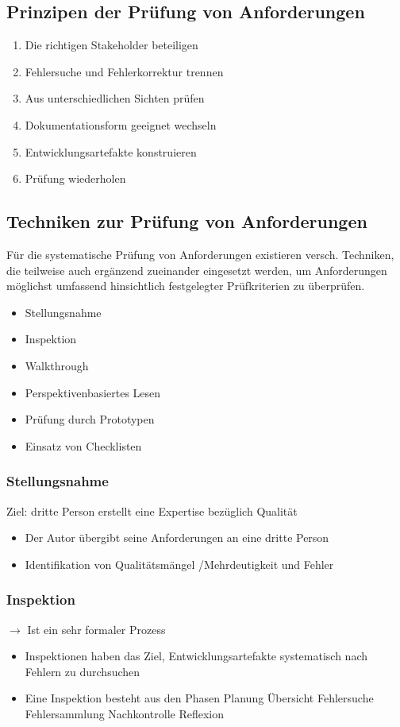 \documentclass{report}
\theoremstyle{definition}
\theoremstyle{example}
\begin{document}
\subsection{Prinzipen der Prüfung von Anforderungen}
\begin{enumerate}
   \item Die richtigen Stakeholder beteiligen
   \item Fehlersuche und Fehlerkorrektur trennen
   \item Aus unterschiedlichen Sichten prüfen
   \item Dokumentationsform geeignet wechseln
   \item Entwicklungsartefakte konstruieren
   \item Prüfung wiederholen
\end{enumerate}

\subsection{Techniken zur Prüfung von Anforderungen}
Für die systematische Prüfung von Anforderungen existieren versch. Techniken, die teilweise auch ergänzend zueinander eingesetzt werden, um Anforderungen möglichst umfassend hinsichtlich festgelegter Prüfkriterien zu überprüfen.
\begin{itemize}
   \item Stellungsnahme
   \item Inspektion
   \item Walkthrough
   \item Perspektivenbasiertes Lesen
   \item Prüfung durch Prototypen
   \item Einsatz von Checklisten
\end{itemize}

\subsubsection{Stellungsnahme}
Ziel: dritte Person erstellt eine Expertise bezüglich Qualität
\begin{itemize}
   \item Der Autor übergibt seine Anforderungen an eine dritte Person
   \item Identifikation von Qualitätsmängel /Mehrdeutigkeit und Fehler
\end{itemize}

\subsubsection{Inspektion}
$\rightarrow$ Ist ein sehr formaler Prozess
\begin{itemize}
   \item Inspektionen haben das Ziel, Entwicklungsartefakte systematisch nach Fehlern zu durchsuchen
   \item Eine Inspektion besteht aus den Phasen
   \subitem Planung
   \subitem Übersicht
   \subitem Fehlersuche
   \subitem Fehlersammlung
   \subitem Nachkontrolle
   \subitem Reflexion
\end{itemize}
\end{document}
